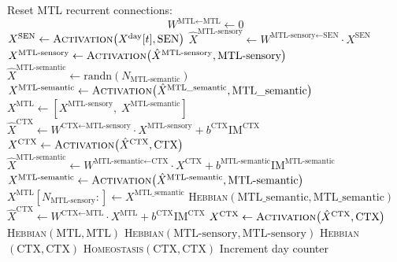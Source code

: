 \documentclass{article}
\begin{document}
\begin{algorithm}[h!]
\caption{Wake}\label{alg:wake}
\begin{algorithmic}[1]
        \State Reset MTL recurrent connections:
            \[
                W^{\textrm{MTL} \leftarrow \textrm{MTL}} \gets 0
            \]
        \State $X^{\textrm{SEN}} \gets \textsc{Activation}\bigl(X^{\textrm{day}}[t], \textrm{SEN}\bigr)$
        \State $\hat{X}^{\textrm{MTL-sensory}} 
            \gets 
            W^{\textrm{MTL-sensory} \leftarrow \textrm{SEN}} 
            \cdot X^{\textrm{SEN}}$
        \State $X^{\textrm{MTL-sensory}} 
            \gets 
            \textsc{Activation}\bigl(\hat{X}^{\textrm{MTL-sensory}}, \textrm{MTL-sensory}\bigr)$
        \State $\hat{X}^{\textrm{MTL-semantic}} 
            \gets 
            \text{randn}(N_\textrm{MTL-semantic})$
        \State $X^{\textrm{MTL-semantic}} 
            \gets 
            \textsc{Activation}\bigl(\hat{X}^{\textrm{MTL\_semantic}}, \textrm{MTL\_semantic}\bigr)$
        \State $X^{\textrm{MTL}} 
            \gets 
            [X^{\textrm{MTL-sensory}}, \; X^{\textrm{MTL-semantic}}]$
        \State $\hat{X}^{\textrm{CTX}} 
            \gets 
            W^{\textrm{CTX} \leftarrow \textrm{MTL-sensory}}\cdot X^{\textrm{MTL-sensory}}  + b^\textrm{CTX}\textrm{IM}^\textrm{CTX}$
        \State $X^{\textrm{CTX}} 
            \gets 
            \textsc{Activation}\bigl(\hat{X}^{\textrm{CTX}}, \textrm{CTX}\bigr)$
            \State $\hat{X}^{\textrm{MTL-semantic}} 
                \gets 
                W^{\textrm{MTL-semantic} \leftarrow \textrm{CTX}}
                \cdot X^{\textrm{CTX}} +  b^\textrm{MTL-semantic}\textrm{IM}^\textrm{MTL-semantic}$
            \State $X^{\textrm{MTL-semantic}} 
                \gets 
                \textsc{Activation}\bigl(\hat{X}^{\textrm{MTL-semantic}}, \textrm{MTL-semantic}\bigr)$
            \State $X^{\textrm{MTL}}[N_\textrm{MTL-sensory}:] 
                \gets 
                X^{\textrm{MTL\_semantic}}$
            \State \textsc{Hebbian}$(\textrm{MTL\_semantic}, \textrm{MTL\_semantic})$
        \EndIf
            \State $\hat{X}^{\textrm{CTX}} 
                \gets 
                W^{\textrm{CTX} \leftarrow \textrm{MTL}}\cdot X^{\textrm{MTL}} +  b^\textrm{CTX}\textrm{IM}^\textrm{CTX}$
            \State $X^{\textrm{CTX}} 
                \gets 
                \textsc{Activation}\bigl(\hat{X}^{\textrm{CTX}}, \textrm{CTX}\bigr)$
        \EndIf
        \State \textsc{Hebbian}$(\textrm{MTL}, \textrm{MTL})$
        \State \textsc{Hebbian}$(\textrm{MTL-sensory}, \textrm{MTL-sensory})$
        \State \textsc{Hebbian}$(\textrm{CTX}, \textrm{CTX})$
        \State \textsc{Homeostasis}$(\textrm{CTX}, \textrm{CTX})$
    \EndFor
    \State Increment day counter
\EndFunction
\end{algorithmic}
\end{algorithm}
\end{document}
